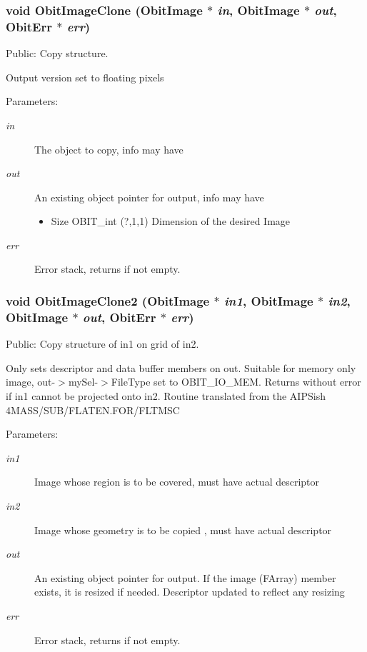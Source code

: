 \subsubsection{\setlength{\rightskip}{0pt plus 5cm}void Obit\-Image\-Clone ({\bf Obit\-Image} $\ast$ {\em in}, {\bf Obit\-Image} $\ast$ {\em out}, {\bf Obit\-Err} $\ast$ {\em err})}\label{ObitImage_8h_a25}


Public: Copy structure. 

Output version set to floating pixels \begin{Desc}
\item[Parameters:]
\begin{description}
\item[{\em in}]The object to copy, info may have \item[{\em out}]An existing object pointer for output, info may have \begin{itemize}
\item Size OBIT\_\-int (?,1,1) Dimension of the desired Image \end{itemize}
\item[{\em err}]Error stack, returns if not empty. \end{description}
\end{Desc}
\subsubsection{\setlength{\rightskip}{0pt plus 5cm}void Obit\-Image\-Clone2 ({\bf Obit\-Image} $\ast$ {\em in1}, {\bf Obit\-Image} $\ast$ {\em in2}, {\bf Obit\-Image} $\ast$ {\em out}, {\bf Obit\-Err} $\ast$ {\em err})}\label{ObitImage_8h_a26}


Public: Copy structure of in1 on grid of in2. 

Only sets descriptor and data buffer members on out. Suitable for memory only image, out-$>$my\-Sel-$>$File\-Type set to OBIT\_\-IO\_\-MEM. Returns without error if in1 cannot be projected onto in2. Routine translated from the AIPSish 4MASS/SUB/FLATEN.FOR/FLTMSC \begin{Desc}
\item[Parameters:]
\begin{description}
\item[{\em in1}]Image whose region is to be covered, must have actual descriptor \item[{\em in2}]Image whose geometry is to be copied , must have actual descriptor \item[{\em out}]An existing object pointer for output. If the image (FArray) member exists, it is resized if needed. Descriptor updated to reflect any resizing \item[{\em err}]Error stack, returns if not empty. \end{description}
\end{Desc}
